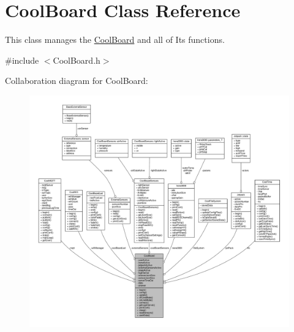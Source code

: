 \hypertarget{classCoolBoard}{}\section{Cool\+Board Class Reference}
\label{classCoolBoard}


This class manages the \hyperlink{classCoolBoard}{Cool\+Board} and all of Its functions.  




{\ttfamily \#include $<$Cool\+Board.\+h$>$}



Collaboration diagram for Cool\+Board\+:\nopagebreak
\begin{figure}[H]
\begin{center}
\leavevmode
\includegraphics[width=350pt]{classCoolBoard__coll__graph}
\end{center}
\end{figure}
